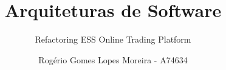\title{Arquiteturas de Software}

\author{Rogério Gomes Lopes Moreira - A74634}

\subtitle{Refactoring ESS Online Trading Platform}

\maketitle